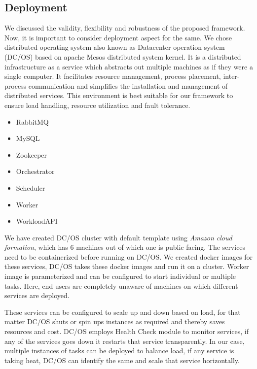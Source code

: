 \documentclass[sigconf]{acmart}
\begin{document}
\subsection{Deployment}
We discussed the validity, flexibility and robustness of the proposed framework. Now, it is important to consider deployment aspect for the same. We chose distributed operating system also known as Datacenter operation system (DC/OS)\cite{dcos} based on apache Mesos distributed system kernel. It is a distributed infrastructure as a service which abstracts out multiple machines as if they were a single computer. It facilitates resource management, process placement, inter-process communication and simplifies the installation and management of distributed services. This environment is best suitable for our framework to ensure load handling, resource utilization and fault tolerance.
\begin{itemize}
\item RabbitMQ
\item MySQL
\item Zookeeper
\item Orchestrator
\item Scheduler
\item Worker
\item WorkloadAPI
\end{itemize}

We have created DC/OS cluster with default template using \textit{Amazon cloud formation}, which has 6 machines out of which one is public facing. 
The services need to be containerized before running on DC/OS. We created docker images for these services, DC/OS takes these docker images and run it on a cluster. Worker image is parameterized and can be configured to start individual or multiple tasks. Here, end users are completely unaware of machines on which different services are deployed.\newline

These services can be configured to scale up and down based on load, for that matter DC/OS shuts or spin ups instances as required and thereby saves resources and cost.  DC/OS employs Health Check module to monitor services, if any of the services goes down it restarts that service transparently. 
In our case, multiple instances of tasks can be deployed to balance load, if any service is taking heat, DC/OS can identify the same and scale that service horizontally. \newline
\end{document}
